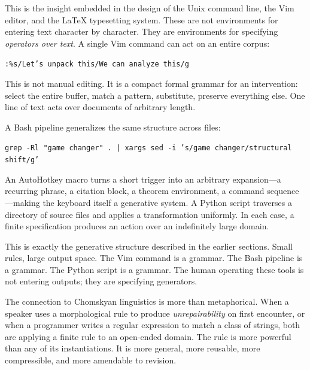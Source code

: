 \documentclass[12pt]{article}
\begin{document}
This is the insight embedded in the design of the Unix command line, the Vim editor, and the \LaTeX{} typesetting system. These are not environments for entering text character by character. They are environments for specifying \emph{operators over text}. A single Vim command can act on an entire corpus:

\begin{mdframed}[backgroundcolor=quoteblock,linewidth=0pt,innerleftmargin=12pt,innerrightmargin=12pt,innertopmargin=8pt,innerbottommargin=8pt]
\texttt{:\%s/Let's unpack this/We can analyze this/g}
\end{mdframed}

This is not manual editing. It is a compact formal grammar for an intervention: select the entire buffer, match a pattern, substitute, preserve everything else. One line of text acts over documents of arbitrary length.

A Bash pipeline generalizes the same structure across files:

\begin{mdframed}[backgroundcolor=quoteblock,linewidth=0pt,innerleftmargin=12pt,innerrightmargin=12pt,innertopmargin=8pt,innerbottommargin=8pt]
\texttt{grep -Rl "game changer" . | xargs sed -i 's/game changer/structural shift/g'}
\end{mdframed}

An AutoHotkey macro turns a short trigger into an arbitrary expansion---a recurring phrase, a citation block, a theorem environment, a command sequence---making the keyboard itself a generative system. A Python script traverses a directory of source files and applies a transformation uniformly. In each case, a finite specification produces an action over an indefinitely large domain.

This is exactly the generative structure described in the earlier sections. Small rules, large output space. The Vim command is a grammar. The Bash pipeline is a grammar. The Python script is a grammar. The human operating these tools is not entering outputs; they are specifying generators.

The connection to Chomskyan linguistics is more than metaphorical. When a speaker uses a morphological rule to produce \textit{unrepairability} on first encounter, or when a programmer writes a regular expression to match a class of strings, both are applying a finite rule to an open-ended domain. The rule is more powerful than any of its instantiations. It is more general, more reusable, more compressible, and more amendable to revision.
\end{document}
